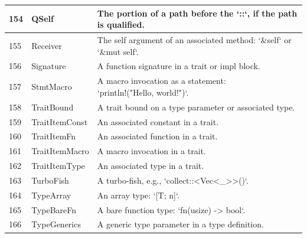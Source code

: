\begin{longtable}{| p{} | p{} | p{} |}
154   & QSelf                          & The portion of a path before the `::`, if the path is qualified.                                               \\ \hline
155   & Receiver                       & The self argument of an associated method: `\&self` or `\&mut self`.                                             \\ \hline
156   & Signature                      & A function signature in a trait or impl block.                                                                 \\ \hline
157   & StmtMacro                      & \makecell{A macro invocation as a statement: \\ `println!("Hello, world!")`.}                                                \\ \hline
158   & TraitBound                     & A trait bound on a type parameter or associated type.                                                          \\ \hline
159   & TraitItemConst                 & An associated constant in a trait.                                                                             \\ \hline
160   & TraitItemFn                    & An associated function in a trait.                                                                             \\ \hline
161   & TraitItemMacro                 & A macro invocation in a trait.                                                                                 \\ \hline
162   & TraitItemType                  & An associated type in a trait.                                                                                 \\ \hline
163   & TurboFish                      & A turbo-fish, e.g., `collect::<Vec<\_>>()`.                                                                     \\ \hline
164   & TypeArray                      & An array type: `[T; n]`.                                                                                       \\ \hline
165   & TypeBareFn                     & A bare function type: `fn(usize) -> bool`.                                                                     \\ \hline
166   & TypeGenerics                   & A generic type parameter in a type definition.                                                                 \\ \hline

\end{longtable}
